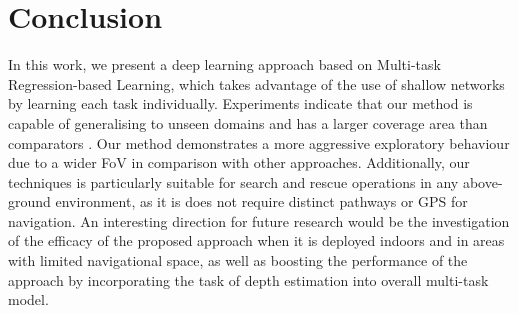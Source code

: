 \documentclass[letterpaper, 10 pt, journal, twoside]{IEEEtran}
\begin{document}
     \section{Conclusion}
In this work, we present a deep learning approach based on Multi-task Regression-based Learning, which takes advantage of the use of shallow networks by learning each task individually. Experiments indicate that our method is capable of generalising to unseen domains and has a larger coverage area than comparators \cite{bojarski2016end, kendall2015posenet, wang2017deepvo}. Our method demonstrates a more aggressive exploratory behaviour due to a wider FoV in comparison with other approaches. Additionally, our techniques is particularly suitable for search and rescue operations in any above-ground environment, as it is does not require distinct pathways or GPS for navigation. An interesting direction for future research would be the investigation of the efficacy of the proposed approach when it is deployed indoors and in areas with limited navigational space, as well as boosting the performance of the approach by incorporating the task of depth estimation into overall multi-task model.




















%
     




 
\end{document}

